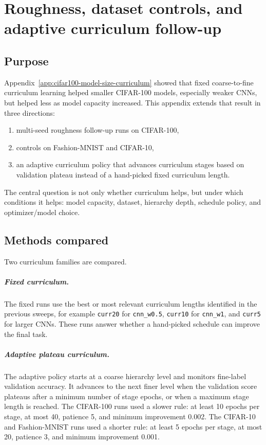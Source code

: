 \chapter{Roughness, dataset controls, and adaptive curriculum follow-up}
\label{app:roughness-followup-curriculum}

\section{Purpose}

Appendix~\ref{app:cifar100-model-size-curriculum} showed that fixed
coarse-to-fine curriculum learning helped smaller CIFAR-100
\cite{krizhevsky2009learning} models, especially weaker CNNs, but helped less
as model capacity increased. This appendix extends that result in three
directions:

\begin{enumerate}
    \item multi-seed roughness follow-up runs on CIFAR-100,
    \item controls on Fashion-MNIST and CIFAR-10,
    \item an adaptive curriculum policy that advances curriculum stages based on
          validation plateau instead of a hand-picked fixed curriculum length.
\end{enumerate}

The central question is not only whether curriculum helps, but under which
conditions it helps: model capacity, dataset, hierarchy depth, schedule policy,
and optimizer/model choice.

\section{Methods compared}

Two curriculum families are compared.

\paragraph{Fixed curriculum.}
The fixed runs use the best or most relevant curriculum lengths identified in the
previous sweeps, for example \texttt{curr20} for \texttt{cnn\_w0.5},
\texttt{curr10} for \texttt{cnn\_w1}, and \texttt{curr5} for larger CNNs.
These runs answer whether a hand-picked schedule can improve the final task.

\paragraph{Adaptive plateau curriculum.}
The adaptive policy starts at a coarse hierarchy level and monitors fine-label
validation accuracy. It advances to the next finer level when the validation
score plateaus after a minimum number of stage epochs, or when a maximum stage
length is reached. The CIFAR-100 runs used a slower rule: at least 10 epochs per
stage, at most 40, patience 5, and minimum improvement 0.002. The CIFAR-10
\cite{krizhevsky2009learning} and Fashion-MNIST \cite{xiao2017fashion} runs
used a shorter rule: at least 5 epochs per stage, at most 20, patience 3, and
minimum improvement 0.001.

